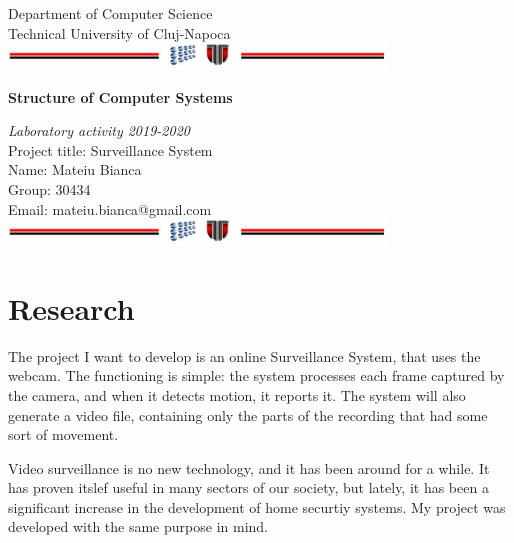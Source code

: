 \documentclass[a4paper,12pt]{report}
\begin{document}
\vspace{-5cm}
\begin{center}
Department of Computer Science\\
Technical University of Cluj-Napoca\\
\includegraphics[width=10cm]{fig/footer}
\end{center}
\vspace{1cm}
\begin{center}
\begin{Large}
\textbf{Structure of Computer Systems}\\
\end{Large}
\textit{Laboratory activity 2019-2020}\\
\vspace{3cm}
Project title: Surveillance System\\
\vspace{1.5cm}
Name: Mateiu Bianca\\
Group: 30434\\
Email: mateiu.bianca@gmail.com\\
\vspace{6cm}
\vspace{1cm}
\includegraphics[width=10cm]{fig/footer}
\end{center}

\tableofcontents

\chapter{Research}

The project I want to develop is an online Surveillance System, that uses the webcam. The functioning is simple: the system processes each frame captured by the camera, and when it detects motion, it reports it. The system will also generate a video file, containing only the parts of the recording that had some sort of movement.

Video surveillance is no new technology, and it has been around for a while. It has proven itslef useful in many sectors of our society, but lately, it has been a significant increase in the development of home securtiy systems. My project was developed with the same purpose in mind.
\end{document}
